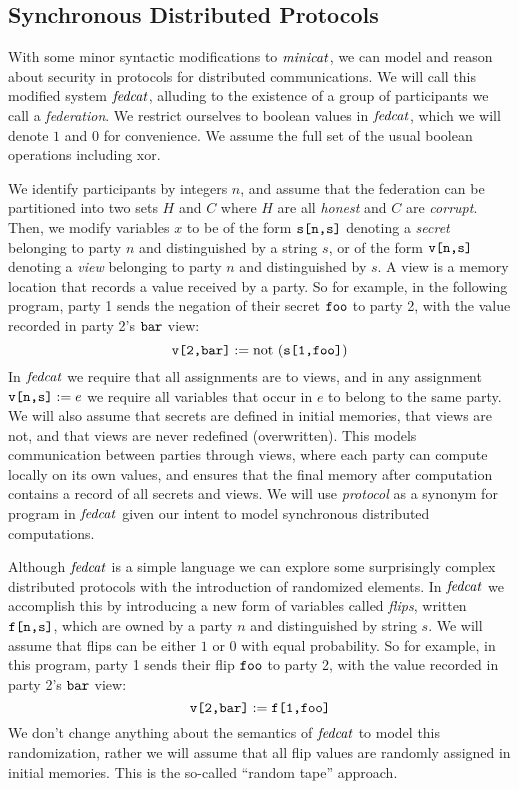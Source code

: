 \subsection{Synchronous Distributed Protocols} With some minor syntactic
modifications to $\mathit{minicat}$, we can model and reason about security in
protocols for distributed communications. We will call this modified
system $\mathit{fedcat}$, alluding to the existence of a group of participants
we call a \emph{federation}. We restrict ourselves to boolean values
in $\mathit{fedcat}$, which we will denote $1$ and $0$ for convenience.  We
assume the full set of the usual boolean operations including xor.

We identify participants by integers $n$, and assume that the
federation can be partitioned into two sets $H$ and $C$ where $H$ are
all \emph{honest} and $C$ are \emph{corrupt}. Then, we modify
variables $x$ to be of the form $\texttt{s[n,s]}$ denoting a \emph{secret}
belonging to party $n$ and distinguished by a string $s$, or of
the form $\texttt{v[n,s]}$ denoting a \emph{view} belonging to party $n$ and
distinguished by $s$. A view is a memory location that records a value
received by a party. So for example, in the following program, party 1
sends the negation of their secret $\texttt{foo}$ to party 2, with the
value recorded in party 2's $\texttt{bar}$ view:
$$
\texttt{v[2,bar]} := \mathrm{not}\  (\texttt{s[1,foo]})
$$ In $\mathit{fedcat}$ we require that all assignments are to views, and in
any assignment $\texttt{v[n,s]} := e$ we require all variables that
occur in $e$ to belong to the same party. We will also assume that
secrets are defined in initial memories, that views are not, and that
views are never redefined (overwritten). This models communication
between parties through views, where each party can compute locally on
its own values, and ensures that the final memory after computation
contains a record of all secrets and views. We will use
\emph{protocol} as a synonym for program in $\mathit{fedcat}$ given our intent
to model synchronous distributed computations.

 Although $\mathit{fedcat}$ is a simple
language we can explore some surprisingly complex distributed
protocols with the introduction of randomized elements. In $\mathit{fedcat}$
we accomplish this by introducing a new form of variables called
\emph{flips}, written $\texttt{f[n,s]}$, which are owned by a party $n$ and
distinguished by string $s$. We will assume that flips can be either
$1$ or $0$ with equal probability.  So for example, in this
program, party 1 sends their flip $\texttt{foo}$ to party 2,
with the value recorded in party 2's $\texttt{bar}$ view:
$$
\texttt{v[2,bar]} := \texttt{f[1,foo]}
$$
We don't change anything about the semantics of $\mathit{fedcat}$
to model this randomization, rather we will assume that all
flip values are randomly assigned in initial memories. This is
the so-called ``random tape'' approach.

